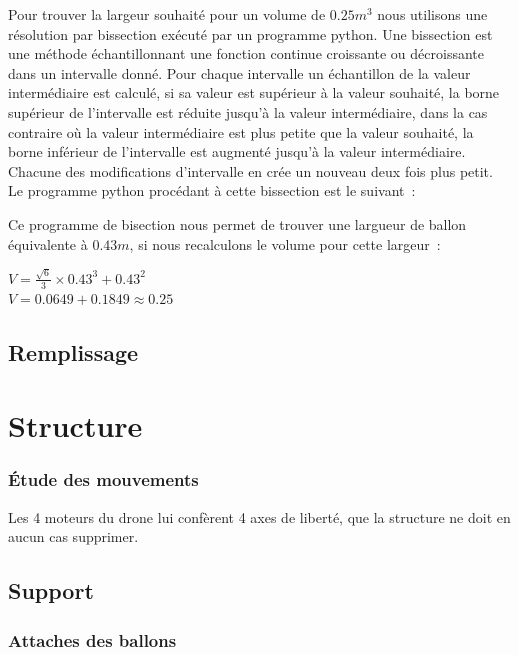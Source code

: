 \documentclass[a4paper,11pt]{article}
\begin{document}
Pour trouver la largeur souhaité pour un volume de $0.25m^3$ nous utilisons une résolution par bissection exécuté par un programme python. Une bissection est une méthode échantillonnant une fonction continue croissante ou décroissante dans un intervalle donné. Pour chaque intervalle un échantillon de la valeur intermédiaire est calculé, si sa valeur est supérieur à la valeur souhaité, la borne supérieur de l'intervalle est réduite jusqu'à la valeur intermédiaire, dans la cas contraire où la valeur intermédiaire est plus petite que la valeur souhaité, la borne inférieur de l'intervalle est augmenté jusqu'à la valeur intermédiaire. Chacune des modifications d'intervalle en crée un nouveau deux fois plus petit.
\medbreak
Le programme python procédant à cette bissection est le suivant~:



Ce programme de bisection nous permet de trouver une largueur de ballon équivalente à $0.43m$, si nous recalculons le volume pour cette largeur~:

\begin{center}
  $\displaystyle{V = \frac{\sqrt{6}}{3} \times 0.43^3 + 0.43^2 }$ \\
	$\displaystyle{V = 0.0649 + 0.1849 \approx 0.25}$
\end{center}

\subsection{Remplissage}



\section{Structure}

\subsubsection{Étude des mouvements}

Les 4 moteurs du drone lui confèrent 4 axes de liberté, que la structure ne doit en aucun cas supprimer.

\subsection{Support}

\subsubsection{Attaches des ballons}
\end{document}
